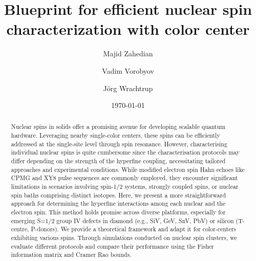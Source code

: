 \documentclass[%
 reprint,
superscriptaddress,
 amsmath,amssymb,
 aps,
]{revtex4-2}
\begin{document}

\title{Blueprint for efficient nuclear spin characterization with  color center}%

\author{Majid Zahedian}


\author{Vadim Vorobyov}

 
\author{J\"org Wrachtrup}

\date{\today}%

\begin{abstract}
Nuclear spins in solids offer a promising avenue for developing scalable quantum hardware. 
Leveraging nearby single-color centers, these spins can be efficiently addressed at the single-site level through spin resonance.
However, characterising individual nuclear spins is quite cumbersome since the characterisation protocols may differ depending on the strength of the hyperfine coupling, necessitating tailored approaches and experimental conditions.
While modified electron spin Hahn echoes like CPMG and XY8 pulse sequences are commonly employed, they encounter significant limitations in scenarios involving spin-1/2 systems, strongly coupled spins, or nuclear spin baths comprising distinct isotopes.
Here, we present a more straightforward approach for determining the hyperfine interactions among each nuclear and the electron spin. 
This method holds promise across diverse platforms, especially for emerging S=1/2 group IV defects in diamond (e.g., SiV, GeV, SnV, PbV) or silicon (T-centre, P-donors). 
We provide a theoretical framework and adapt it for color-centers exhibiting various spins. Through simulations conducted on nuclear spin clusters, we evaluate different protocols and compare their performance using the Fisher information matrix and Cramer Rao bounds.
\end{abstract}
\end{document}
